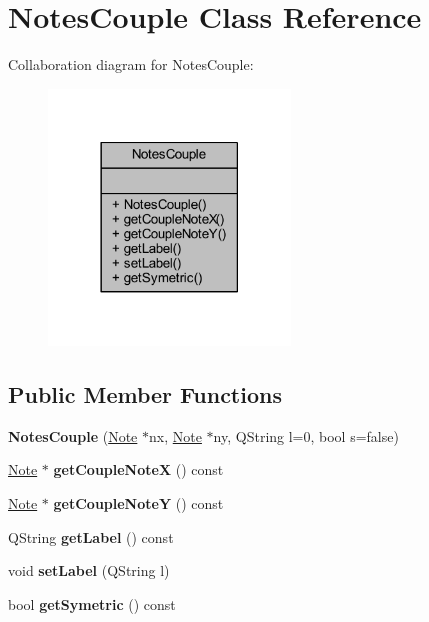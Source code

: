 \hypertarget{class_notes_couple}{}\section{Notes\+Couple Class Reference}
\label{class_notes_couple}


Collaboration diagram for Notes\+Couple\+:\nopagebreak
\begin{figure}[H]
\begin{center}
\leavevmode
\includegraphics[width=182pt]{class_notes_couple__coll__graph}
\end{center}
\end{figure}
\subsection*{Public Member Functions}
\begin{DoxyCompactItemize}
\item 
\mbox{\label{class_notes_couple_ac9bb6dd9ba7376af7030f3b64a24ae88}} 
{\bfseries Notes\+Couple} (\hyperlink{class_note}{Note} $\ast$nx, \hyperlink{class_note}{Note} $\ast$ny, Q\+String l=0, bool s=false)
\item 
\mbox{\label{class_notes_couple_a1769af8ac96f94717f9b59011ee3cab1}} 
\hyperlink{class_note}{Note} $\ast$ {\bfseries get\+Couple\+NoteX} () const
\item 
\mbox{\label{class_notes_couple_ab56dc53d43664f370a8d2af58c9d4b90}} 
\hyperlink{class_note}{Note} $\ast$ {\bfseries get\+Couple\+NoteY} () const
\item 
\mbox{\label{class_notes_couple_ac163d6cd5d3f17f7b74ec353e8feffb9}} 
Q\+String {\bfseries get\+Label} () const
\item 
\mbox{\label{class_notes_couple_a12fd471a0510e598869592460377258f}} 
void {\bfseries set\+Label} (Q\+String l)
\item 
\mbox{\label{class_notes_couple_addb870bdbfdd5586f214c908122e597d}} 
bool {\bfseries get\+Symetric} () const
\end{DoxyCompactItemize}



